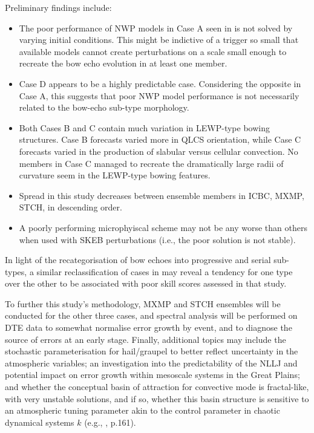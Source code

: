 \documentclass{ametsoc}
\begin{document}
Preliminary findings include:

\begin{itemize}
\item The poor performance of NWP models in Case A seen in \citet{Snively2014-pr} is not solved by varying initial conditions. This might be indictive of a trigger so small that available models cannot create perturbations on a scale small enough to recreate the bow echo evolution in at least one member.
\item Case D appears to be a highly predictable case. Considering the opposite in Case A, this suggests that poor NWP model performance is not necessarily related to the bow-echo sub-type morphology.
\item Both Cases B and C contain much variation in LEWP-type bowing structures. Case B forecasts varied more in QLCS orientation, while Case C forecasts varied in the production of slabular versus cellular convection. No members in Case C managed to recreate the dramatically large radii of curvature seem in the LEWP-type bowing features.
\item Spread in this study decreases between ensemble members in ICBC, MXMP, STCH, in descending order.
\item A poorly performing microphyiscal scheme may not be any worse than others when used with SKEB perturbations (i.e., the poor solution is not stable).
\end{itemize}

In light of the recategorisation of bow echoes into progressive and serial sub-types, a similar reclassification of cases in \citet{Snively2014-pr} may reveal a tendency for one type over the other to be associated with poor skill scores assessed in that study. 

To further this study's methodology, MXMP and STCH ensembles will be conducted for the other three cases, and spectral analysis will be performed on DTE data to somewhat normalise error growth by event, and to diagnose the source of errors at an early stage. Finally, additional topics may include the stochastic parameterisation for hail/graupel to better reflect uncertainty in the atmospheric variables; an investigation into the predictability of the NLLJ and potential impact on error growth within mesoscale systems in the Great Plains; and whether the conceptual basin of attraction for convective mode is fractal-like, with very unstable solutions, and if so, whether this basin structure is sensitive to an atmospheric tuning parameter akin to the control parameter in chaotic dynamical systems $k$ (e.g., \citealt{Williams1997-yg}, p.161).
\end{document}
